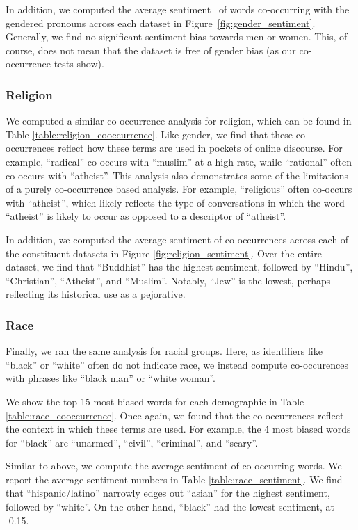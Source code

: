 \documentclass[11pt,a4paper]{article}
\begin{document}
In addition, we computed the average sentiment~\citep{sentiment} of words co-occurring with the gendered pronouns across each dataset in Figure~\ref{fig:gender_sentiment}. Generally, we find no significant sentiment bias towards men or women. This, of course, does not mean that the dataset is free of gender bias (as our co-occurrence tests show).

\subsubsection{Religion}
We computed a similar co-occurrence analysis for religion, which can be found in Table \ref{table:religion_cooccurrence}. Like gender, we find that these co-occurrences reflect how these terms are used in pockets of online discourse. For example, ``radical'' co-occurs with ``muslim'' at a high rate, while ``rational'' often co-occurs with ``atheist''. This analysis also demonstrates some of the limitations of a purely co-occurrence based analysis. For example, ``religious'' often co-occurs with ``atheist'', which likely reflects the type of conversations in which the word ``atheist'' is likely to occur as opposed to a descriptor of ``atheist''.

In addition, we computed the average sentiment of co-occurrences across each of the constituent datasets in Figure \ref{fig:religion_sentiment}. Over the entire dataset, we find that ``Buddhist'' has the highest sentiment, followed by ``Hindu'',  ``Christian'', ``Atheist'', and ``Muslim''. Notably, ``Jew'' is the lowest, perhaps reflecting its historical use as a pejorative.

\subsubsection{Race}
Finally, we ran the same analysis for racial groups. Here, as identifiers like ``black'' or ``white'' often do not indicate race, we instead compute co-occurences with phrases like ``black man'' or ``white woman''.

We show the top 15 most biased words for each demographic in Table \ref{table:race_cooccurrence}. Once again, we found that the co-occurrences reflect the context in which these terms are used. For example, the 4 most biased words for ``black'' are ``unarmed'', ``civil'', ``criminal'', and ``scary''.

Similar to above, we compute the average sentiment of co-occurring words. We report the average sentiment numbers in Table \ref{table:race_sentiment}. We find that ``hispanic/latino'' narrowly edges out ``asian'' for the highest sentiment, followed by ``white''. On the other hand, ``black'' had the lowest sentiment, at -0.15.
\end{document}
